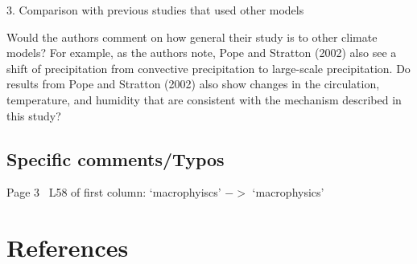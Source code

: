 \documentclass[12pt,oneside,a4paper]{article}%
\begin{document}
{\color{red}{Working on this.}} \newline

3. Comparison with previous studies that used other models \newline

Would the authors comment on how general their study is to other climate models? For example, as the authors note, Pope and Stratton (2002) also see a shift of precipitation from convective precipitation to large-scale precipitation. Do results from Pope and Stratton (2002) also show changes in the circulation, temperature, and humidity that are consistent with the mechanism described in this study? \newline

{\color{red}{See General Remarks.}}

\subsection*{\small Specific comments/Typos}

Page 3 ~L58 of first column: ‘macrophyiscs’ $->$ ‘macrophysics’ \newline

{\color{red}{Fixed typo.}}

\section*{\normalsize References}
\setlength{\bibsep}{0pt}
{\footnotesize
}
\end{document}
